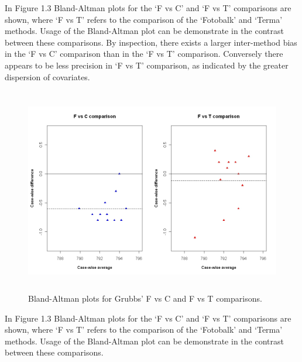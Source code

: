 \documentclass[Main.tex]{subfiles}
\begin{document}
	
	
	In Figure 1.3 Bland-Altman plots for the `F vs C' and `F vs T'
	comparisons are shown, where `F vs T' refers to the comparison of
	the `Fotobalk' and `Terma' methods. Usage of the Bland-Altman plot
	can be demonstrate in the contrast between these comparisons. By inspection, there exists a larger inter-method bias in the `F vs C' comparison than in the `F vs T' comparison. Conversely there
	appears to be less precision in `F vs T' comparison, as indicated
	by the greater dispersion of covariates.
	
	\begin{figure}[h!]
		\begin{center}
			\includegraphics[height=90mm]{images/GrubbsDataTwoBAplots.jpeg}
			\caption{Bland-Altman plots for Grubbs' F vs C and F vs T comparisons.}\label{GrubbsDataTwoBAplots}
		\end{center}
	\end{figure}
	

	
	
	In Figure 1.3 Bland-Altman plots for the `F vs C' and `F vs T'
	comparisons are shown, where `F vs T' refers to the comparison of
	the `Fotobalk' and `Terma' methods. Usage of the Bland-Altman plot
	can be demonstrate in the contrast between these comparisons.
	
\end{document}
